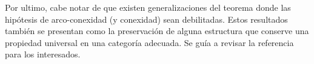 Por ultimo, cabe notar de que existen generalizaciones del teorema \vank
donde las hipótesis de arco-conexidad (y conexidad) sean debilitadas.
Estos resultados también se presentan como la preservación de alguna
estructura que conserve una propiedad universal en una categoría
adecuada. Se guía a revisar la referencia \cite{brown} para los
interesados.
